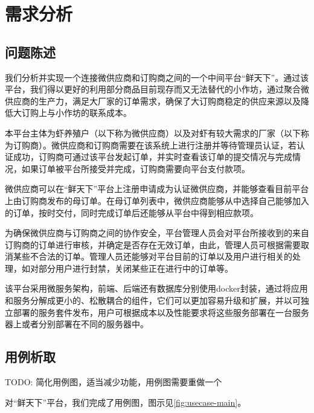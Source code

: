 \chapter{需求分析}

\label{cha:demand_analysis}
\section{问题陈述}


我们分析并实现一个连接微供应商和订购商之间的一个中间平台“鲜天下”。通过该平台，我们得以更好的利用部分商品目前现存而又无法替代的小作坊，通过聚合微供应商的生产力，满足大厂家的订单需求，确保了大订购商稳定的供应来源以及降低大订购上与小作坊的联系成本。

本平台主体为虾养殖户（以下称为微供应商）以及对虾有较大需求的厂家（以下称为订购商）。微供应商和订购商需要在该系统上进行注册并等待管理员认证，若认证成功，订购商可通过该平台发起订单，并实时查看该订单的提交情况与完成情况，如果订单被平台所接受并完成，订购商需要向平台支付款项。

微供应商可以在“鲜天下”平台上注册申请成为认证微供应商，并能够查看目前平台上由订购商发布的母订单。在母订单列表中，微供应商能够从中选择自己能够加入的订单，按时交付，同时完成订单后还能够从平台中得到相应款项。


为确保微供应商与订购商之间的协作安全，平台管理人员会对平台所接收到的来自订购商的订单进行审核，并确定是否存在无效订单，由此，管理人员可根据需要取消某些不合法的订单。管理人员还能够对平台目前的订单以及用户进行相关的处理，如对部分用户进行封禁，关闭某些正在进行中的订单等。


该平台采用微服务架构，前端、后端还有数据库分别使用docker封装，通过将应用和服务分解成更小的、松散耦合的组件，它们可以更加容易升级和扩展，并以可独立部署的服务套件发布，用户可根据成本以及性能要求将这些服务部署在一台服务器上或者分别部署在不同的服务器中。


\section{用例析取}

TODO: 简化用例图，适当减少功能，用例图需要重做一个

对“鲜天下”平台，我们完成了用例图，图示见\autoref{fig:usecase-main}。

